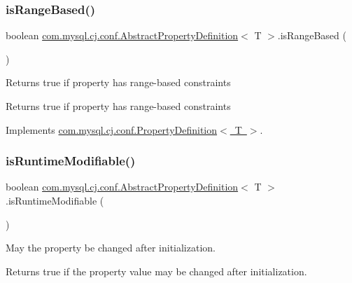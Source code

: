 \subsubsection{\texorpdfstring{is\+Range\+Based()}{isRangeBased()}}
{\footnotesize\ttfamily boolean \mbox{\hyperlink{classcom_1_1mysql_1_1cj_1_1conf_1_1_abstract_property_definition}{com.\+mysql.\+cj.\+conf.\+Abstract\+Property\+Definition}}$<$ T $>$.is\+Range\+Based (\begin{DoxyParamCaption}{ }\end{DoxyParamCaption})}

Returns true if property has range-\/based constraints

\begin{DoxyReturn}{Returns}
true if property has range-\/based constraints 
\end{DoxyReturn}


Implements \mbox{\hyperlink{interfacecom_1_1mysql_1_1cj_1_1conf_1_1_property_definition_a2bf2cf38bb5d0aad4d150cda93042052}{com.\+mysql.\+cj.\+conf.\+Property\+Definition$<$ T $>$}}.

\mbox{\label{classcom_1_1mysql_1_1cj_1_1conf_1_1_abstract_property_definition_a6c98140b2db84ccd0ff29ce165ec9ef5}} 
\subsubsection{\texorpdfstring{is\+Runtime\+Modifiable()}{isRuntimeModifiable()}}
{\footnotesize\ttfamily boolean \mbox{\hyperlink{classcom_1_1mysql_1_1cj_1_1conf_1_1_abstract_property_definition}{com.\+mysql.\+cj.\+conf.\+Abstract\+Property\+Definition}}$<$ T $>$.is\+Runtime\+Modifiable (\begin{DoxyParamCaption}{ }\end{DoxyParamCaption})}

May the property be changed after initialization.

\begin{DoxyReturn}{Returns}
true if the property value may be changed after initialization. 
\end{DoxyReturn}



